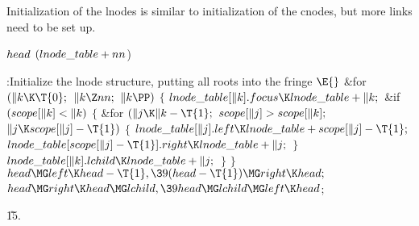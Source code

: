 Initialization of the lnodes is similar to
initialization of the cnodes,
but more links need to be set up.

\Y\B\4\D$\\{head}$ \5
$(\\{lnode\_table}+\\{nn}{}$)\par
\Y\B\4:Initialize the lnode structure, putting all roots into the fringe%
\X${}\E{}$\6
\&{for} ${}(\|k\K\T{0};{}$ ${}\|k\Z\\{nn};{}$ ${}\|k\PP){}$\5
${}\{{}$\1\6
${}\\{lnode\_table}[\|k].\\{focus}\K\\{lnode\_table}+\|k;{}$\6
\&{if} ${}(\\{scope}[\|k]<\|k){}$\5
${}\{{}$\1\6
\&{for} ${}(\|j\K\|k-\T{1};{}$ ${}\\{scope}[\|j]>\\{scope}[\|k];{}$ ${}\|j\K%
\\{scope}[\|j]-\T{1}){}$\5
${}\{{}$\1\6
${}\\{lnode\_table}[\|j].\\{left}\K\\{lnode\_table}+\\{scope}[\|j]-\T{1};{}$\6
${}\\{lnode\_table}[\\{scope}[\|j]-\T{1}].\\{right}\K\\{lnode\_table}+\|j;{}$\6
\4${}\}{}$\2\6
${}\\{lnode\_table}[\|k].\\{lchild}\K\\{lnode\_table}+\|j;{}$\6
\4${}\}{}$\2\6
\4${}\}{}$\2\6
${}\\{head}\MG\\{left}\K\\{head}-\T{1},\39(\\{head}-\T{1})\MG\\{right}\K%
\\{head};{}$\6
${}\\{head}\MG\\{right}\K\\{head}\MG\\{lchild},\39\\{head}\MG\\{lchild}\MG%
\\{left}\K\\{head}{}$;\par
\U15.\fi

